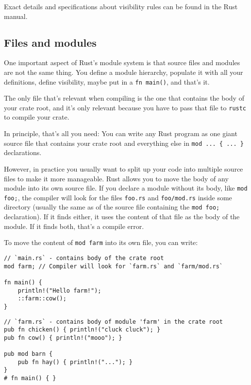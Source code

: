 \documentclass[]{article}
\begin{document}
Exact details and specifications about visibility rules can be found in
the Rust manual.

\subsection{Files and modules}\label{files-and-modules}

One important aspect of Rust's module system is that source files and
modules are not the same thing. You define a module hierarchy, populate
it with all your definitions, define visibility, maybe put in a
\texttt{fn main()}, and that's it.

The only file that's relevant when compiling is the one that contains
the body of your crate root, and it's only relevant because you have to
pass that file to \texttt{rustc} to compile your crate.

In principle, that's all you need: You can write any Rust program as one
giant source file that contains your crate root and everything else in
\texttt{mod ... \{ ... \}} declarations.

However, in practice you usually want to split up your code into
multiple source files to make it more manageable. Rust allows you to
move the body of any module into its own source file. If you declare a
module without its body, like \texttt{mod foo;}, the compiler will look
for the files \texttt{foo.rs} and \texttt{foo/mod.rs} inside some
directory (usually the same as of the source file containing the
\texttt{mod foo;} declaration). If it finds either, it uses the content
of that file as the body of the module. If it finds both, that's a
compile error.

To move the content of \texttt{mod farm} into its own file, you can
write:

\begin{verbatim}
// `main.rs` - contains body of the crate root
mod farm; // Compiler will look for `farm.rs` and `farm/mod.rs`

fn main() {
    println!("Hello farm!");
    ::farm::cow();
}
\end{verbatim}

\begin{verbatim}
// `farm.rs` - contains body of module 'farm' in the crate root
pub fn chicken() { println!("cluck cluck"); }
pub fn cow() { println!("mooo"); }

pub mod barn {
    pub fn hay() { println!("..."); }
}
# fn main() { }
\end{verbatim}
\end{document}
